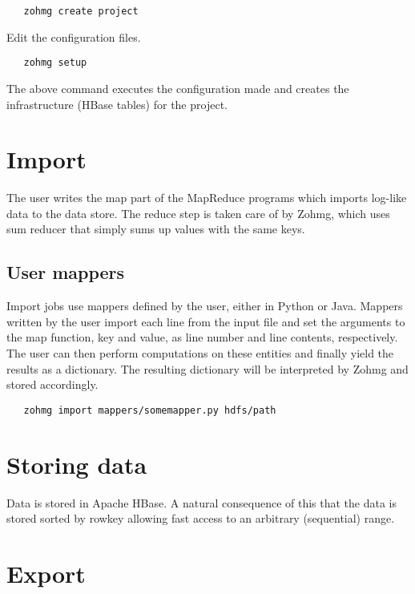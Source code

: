 \documentclass[a4paper,10pt]{book}
\begin{document}
\begin{verbatim}
   zohmg create project
\end{verbatim}

\noindent Edit the configuration files.

\begin{verbatim}
   zohmg setup
\end{verbatim}

\noindent The above command executes the configuration made and creates the
infrastructure (HBase tables) for the project.


\section{Import}

The user writes the map part of the MapReduce programs which imports
log-like data to the data store. The reduce step is taken care of by Zohmg,
which uses sum reducer that simply sums up values with the same keys.


\subsection{User mappers}

Import jobs use mappers defined by the user, either in Python or Java.
Mappers written by the user import each line from the input file and set
the arguments to the map function, key and value, as line number and line
contents, respectively. The user can then perform computations on these
entities and finally yield the results as a dictionary. The resulting
dictionary will be interpreted by Zohmg and stored accordingly.

\begin{verbatim}
   zohmg import mappers/somemapper.py hdfs/path
\end{verbatim}


\section{Storing data}

Data is stored in Apache HBase. A natural consequence of this that the
data is stored sorted by rowkey allowing fast access to an arbitrary
(sequential) range.



\section{Export}
\end{document}
